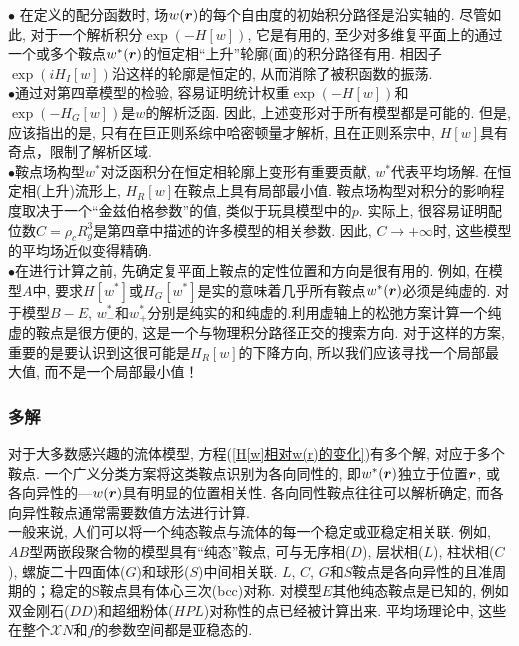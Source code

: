 $\bullet$ 在定义的配分函数时, 场$w(\bm{r})$的每个自由度的初始积分路径是沿实轴的. 尽管如此, 对于一个解析积分$\exp(-H[w])$, 它是有用的, 至少对多维复平面上的通过一个或多个鞍点$w^*(\bm{r})$的恒定相“上升”轮廓(面)的积分路径有用. 相因子$\exp(iH_I[w])$沿这样的轮廓是恒定的, 从而消除了被积函数的振荡. \\

 $\bullet$通过对第四章模型的检验, 容易证明统计权重$\exp(-H[w])$和$\exp(-H_G[w])$是$w$的解析泛函. 因此, 上述变形对于所有模型都是可能的. 但是, 应该指出的是, 只有在巨正则系综中哈密顿量才解析, 且在正则系宗中, $H[w]$具有奇点，限制了解析区域. \\

$\bullet$鞍点场构型$w^*$对泛函积分在恒定相轮廓上变形有重要贡献, $w^*$代表平均场解. 在恒定相(上升)流形上, $H_R[w]$在鞍点上具有局部最小值. 鞍点场构型对积分的影响程度取决于一个“金兹伯格参数”的值, 类似于玩具模型中的$p$. 实际上, 很容易证明配位数$C=\rho_cR_g^3$是第四章中描述的许多模型的相关参数. 因此, $C\rightarrow +\infty$时, 这些模型的平均场近似变得精确. \\

$\bullet$在进行计算之前, 先确定复平面上鞍点的定性位置和方向是很有用的. 例如, 在模型$A$中, 要求$H[w^*]$或$H_G[w^*]$是实的意味着几乎所有鞍点$w^*(\bm{r})$必须是纯虚的. 对于模型$B-E$, $w_{-}^*$和$w_{+}^{*}$分别是纯实的和纯虚的.利用虚轴上的松弛方案计算一个纯虚的鞍点是很方便的, 这是一个与物理积分路径正交的搜索方向. 对于这样的方案, 重要的是要认识到这很可能是$H_R[w]$的下降方向, 所以我们应该寻找一个局部最大值, 而不是一个局部最小值！\\
\subsubsection{多解}
对于大多数感兴趣的流体模型, 方程(\ref{H[w]相对w(r)的变化})有多个解, 对应于多个鞍点. 一个广义分类方案将这类鞍点识别为各向同性的, 即$w^*(\bm{r})$独立于位置$\bm{r}$, 或各向异性的—$w(\bm{r})$具有明显的位置相关性. 各向同性鞍点往往可以解析确定, 而各向异性鞍点通常需要数值方法进行计算. \\

一般来说, 人们可以将一个纯态鞍点与流体的每一个稳定或亚稳定相关联. 例如, $AB$型两嵌段聚合物的模型具有“纯态”鞍点, 可与无序相($D$), 层状相($L$), 柱状相($C$), 螺旋二十四面体($G$)和球形($S$)中间相关联. $L$, $C$, $G$和$S$鞍点是各向异性的且准周期的；稳定的S鞍点具有体心三次(bcc)对称. 对模型$E$其他纯态鞍点是已知的, 例如双金刚石($DD$)和超细粉体($HPL$)对称性的点已经被计算出来. 平均场理论中, 这些在整个$\mathcal{X}N$和$f$的参数空间都是亚稳态的. \\

